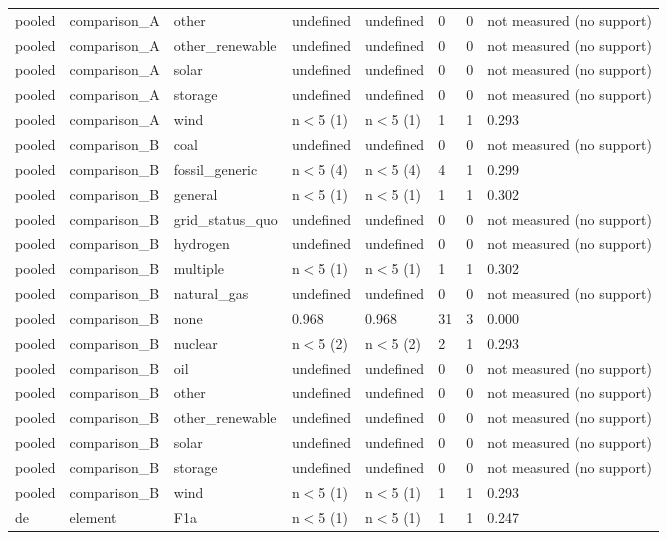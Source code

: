 \begin{table}[htbp]
\begin{tabular}{llllllll}
pooled & comparison\_A & other & undefined & undefined & 0 & 0 & not measured (no support) \\
pooled & comparison\_A & other\_renewable & undefined & undefined & 0 & 0 & not measured (no support) \\
pooled & comparison\_A & solar & undefined & undefined & 0 & 0 & not measured (no support) \\
pooled & comparison\_A & storage & undefined & undefined & 0 & 0 & not measured (no support) \\
pooled & comparison\_A & wind & n$<$5 (1) & n$<$5 (1) & 1 & 1 & 0.293 \\
pooled & comparison\_B & coal & undefined & undefined & 0 & 0 & not measured (no support) \\
pooled & comparison\_B & fossil\_generic & n$<$5 (4) & n$<$5 (4) & 4 & 1 & 0.299 \\
pooled & comparison\_B & general & n$<$5 (1) & n$<$5 (1) & 1 & 1 & 0.302 \\
pooled & comparison\_B & grid\_status\_quo & undefined & undefined & 0 & 0 & not measured (no support) \\
pooled & comparison\_B & hydrogen & undefined & undefined & 0 & 0 & not measured (no support) \\
pooled & comparison\_B & multiple & n$<$5 (1) & n$<$5 (1) & 1 & 1 & 0.302 \\
pooled & comparison\_B & natural\_gas & undefined & undefined & 0 & 0 & not measured (no support) \\
pooled & comparison\_B & none & 0.968 & 0.968 & 31 & 3 & 0.000 \\
pooled & comparison\_B & nuclear & n$<$5 (2) & n$<$5 (2) & 2 & 1 & 0.293 \\
pooled & comparison\_B & oil & undefined & undefined & 0 & 0 & not measured (no support) \\
pooled & comparison\_B & other & undefined & undefined & 0 & 0 & not measured (no support) \\
pooled & comparison\_B & other\_renewable & undefined & undefined & 0 & 0 & not measured (no support) \\
pooled & comparison\_B & solar & undefined & undefined & 0 & 0 & not measured (no support) \\
pooled & comparison\_B & storage & undefined & undefined & 0 & 0 & not measured (no support) \\
pooled & comparison\_B & wind & n$<$5 (1) & n$<$5 (1) & 1 & 1 & 0.293 \\
de & element & F1a & n$<$5 (1) & n$<$5 (1) & 1 & 1 & 0.247 \\

\end{tabular}
\end{table}
